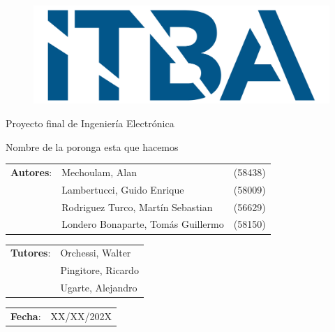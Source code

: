 \begin{titlepage}
\begin{figure}[H]
	\centering
	\includegraphics[width=0.5\linewidth]{./ITBA_2}
\end{figure}

\vspace*{1.5cm}

\center
{\Huge Proyecto final de Ingeniería Electrónica }

\vspace*{1cm}

{\LARGE \textcolor{PName}{Nombre de la poronga esta que hacemos} }

\vspace*{1.5cm}

\begin{tabular}{llr} 	
\textbf{Autores}: & Mechoulam, Alan  &  (58438)\\
 & Lambertucci, Guido Enrique  & (58009) \\
 & Rodriguez Turco, Martín Sebastian  & (56629) \\
 & Londero Bonaparte, Tomás Guillermo  & (58150) \\
\end{tabular}

\vspace*{1.5cm}

\begin{tabular}{ll} 	
\textbf{Tutores}: & Orchessi, Walter\\
 & Pingitore, Ricardo\\
 & Ugarte, Alejandro\\
\end{tabular}

\vspace*{1.5cm}

\begin{tabular}{lr} 	
\textbf{Fecha}: & XX/XX/202X\\
\end{tabular}

\end{titlepage}
